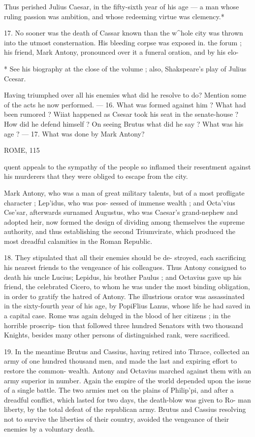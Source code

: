 \documentclass[openany,a4paper]{memoir}
\begin{document}
Thus perished Julius Caesar, in the fifty-sixth year of his 
age — a man whose ruling passion was ambition, and whose 
redeeming virtue was clemency.* 

17. No sooner was the death of Cassar known than the 
w^hole city was thrown into the utmost consternation. His 
bleeding corpse was exposed in. the forum ; his friend, Mark 
Antony, pronounced over it a funeral oration, and by his elo- 

* See his biography at the close of the volume ; also, Shakspeare's play 
of Julius Ccesar. 

Having triumphed over all his enemies what did he resolve to do? 
Mention some of the acts he now performed. — 16. What was formed 
against him ? What had been rumored ? Wiiat happened as Csesar took 
his seat in the senate-house ? How did he defend himself ? On seeing 
Brutus what did he say ? What was his age ? — 17. What was done by 
Mark Antony? 



ROME, 115 

quent appeals to the sympathy of the people so inflamed 
their resentment against his murderers that they were 
obliged to escape from the city. 

Mark Antony, who was a man of great military talents, 
but of a most profligate character ; Lep'idus, who was pos- 
sessed of immense wealth ; and Octa'vius Cse'sar, afterwards 
surnamed Augustus, who was Caesar's grand-nephew and 
adopted heir, now formed the design of dividing among 
themselves the supreme authority, and thus establishing 
the second Triumvirate, which produced the most dreadful 
calamities in the Roman Republic. 

18. They stipulated that all their enemies should be de- 
stroyed, each sacrificing his nearest friends to the vengeance 
of his colleagues. Thus Antony consigned to death his 
uncle Lucius; Lepidus, his brother Paulus ; and Octavius 
gave up his friend, the celebrated Cicero, to whom he was 
under the most binding obligation, in order to gratify the 
hatred of Antony. The illustrious orator was assassinated 
in the sixty-fourth year of his age, by PopiFlius Lanus, 
whose life he had saved in a capital case. Rome was again 
deluged in the blood of her citizens ; in the horrible proscrip- 
tion that followed three hundred Senators with two thousand 
Knights, besides many other persons of distinguished rank, 
were sacrificed. 

19. In the meantime Brutus and Cassius, having retired 
into Thrace, collected an army of one hundred thousand men, 
and made the last and expiring effort to restore the common- 
wealth. Antony and Octavius marched against them with 
an army superior in number. Again the empire of the world 
depended upon the issue of a single battle. The two armies 
met on the plains of Philip'pi, and after a dreadful conflict, 
which lasted for two days, the death-blow was given to Ro- 
man liberty, by the total defeat of the republican army. 
Brutus and Cassius resolving not to survive the liberties 
of their country, avoided the vengeance of their enemies by 
a voluntary death. 
\end{document}
